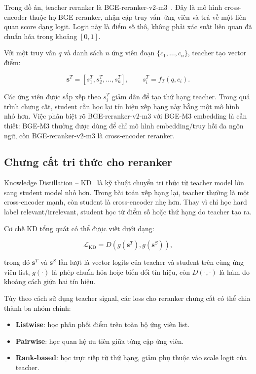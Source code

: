 \documentclass[../DoAn.tex]{subfiles}
\begin{document}
Trong đồ án, teacher reranker là BGE-reranker-v2-m3~\cite{bge_reranker_v2_m3}. Đây là mô hình cross-encoder thuộc họ BGE reranker, nhận cặp truy vấn--ứng viên và trả về một liên quan score dạng logit. Logit này là điểm số thô, không phải xác suất liên quan đã chuẩn hóa trong khoảng $[0,1]$.

Với một truy vấn $q$ và danh sách $n$ ứng viên đoạn $\{c_1,\ldots,c_n\}$, teacher tạo vector điểm:

\[
\mathbf{s}^{T}
=
\left[
s_1^T, s_2^T,\ldots,s_n^T
\right],
\qquad
s_i^T = f_T(q,c_i).
\]

Các ứng viên được sắp xếp theo $s_i^T$ giảm dần để tạo thứ hạng teacher. Trong quá trình chưng cất, student cần học lại tín hiệu xếp hạng này bằng một mô hình nhỏ hơn. Việc phân biệt rõ BGE-reranker-v2-m3 với BGE-M3 embedding là cần thiết: BGE-M3 thường được dùng để chỉ mô hình embedding/truy hồi đa ngôn ngữ, còn BGE-reranker-v2-m3 là cross-encoder reranker.

\subsection{Chưng cất tri thức cho reranker}
\label{subsection:2.3.3}

Knowledge Distillation -- KD~\cite{hinton2015distillation} là kỹ thuật chuyển tri thức từ teacher model lớn sang student model nhỏ hơn. Trong bài toán xếp hạng lại, teacher thường là một cross-encoder mạnh, còn student là cross-encoder nhẹ hơn. Thay vì chỉ học hard label relevant/irrelevant, student học từ điểm số hoặc thứ hạng do teacher tạo ra.

Cơ chế KD tổng quát có thể được viết dưới dạng:

\[
\mathcal{L}_{\mathrm{KD}}
=
D
\left(
g(\mathbf{s}^{T}),
g(\mathbf{s}^{S})
\right),
\]

trong đó $\mathbf{s}^{T}$ và $\mathbf{s}^{S}$ lần lượt là vector logits của teacher và student trên cùng ứng viên list, $g(\cdot)$ là phép chuẩn hóa hoặc biến đổi tín hiệu, còn $D(\cdot,\cdot)$ là hàm đo khoảng cách giữa hai tín hiệu.

Tùy theo cách sử dụng teacher signal, các loss cho reranker chưng cất có thể chia thành ba nhóm chính:

\begin{itemize}
\item \textbf{Listwise}: học phân phối điểm trên toàn bộ ứng viên list.
\item \textbf{Pairwise}: học quan hệ ưu tiên giữa từng cặp ứng viên.
\item \textbf{Rank-based}: học trực tiếp từ thứ hạng, giảm phụ thuộc vào scale logit của teacher.
\end{itemize}
\end{document}
